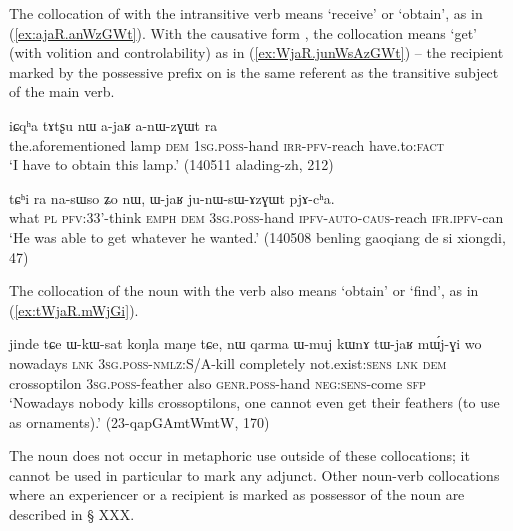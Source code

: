 The collocation of  with the intransitive verb  means `receive' or `obtain', as in (\ref{ex:ajaR.anWzGWt}). With the causative form , the collocation means `get' (with volition and controlability) as in (\ref{ex:WjaR.junWsAzGWt}) -- the recipient marked by the possessive prefix on   is the same referent as the transitive subject of the main verb.

\begin{exe}
\ex \label{ex:ajaR.anWzGWt}
\gll iɕqʰa tɤtʂu nɯ a-jaʁ a-nɯ-zɣɯt ra \\
the.aforementioned lamp \textsc{dem} \textsc{1sg}.\textsc{poss}-hand \textsc{irr}-\textsc{pfv}-reach have.to:\textsc{fact} \\
\glt   `I have to obtain this lamp.' (140511 alading-zh, 212)
\end{exe}

\begin{exe}
\ex \label{ex:WjaR.junWsAzGWt}
\gll tɕʰi ra na-sɯso ʑo nɯ, ɯ-jaʁ ju-nɯ-sɯ-ɤzɣɯt pjɤ-cʰa.  \\
what \textsc{pl} \textsc{pfv}:3\fl{}3'-think \textsc{emph} \textsc{dem} \textsc{3sg}.\textsc{poss}-hand \textsc{ipfv}-\textsc{auto}-\textsc{caus}-reach \textsc{ifr}.\textsc{ipfv}-can \\
\glt  `He was able to get whatever he wanted.' (140508 benling gaoqiang de si xiongdi, 47)
\end{exe}

The collocation of the noun  with the verb  also means `obtain' or `find', as in (\ref{ex:tWjaR.mWjGi}).

\begin{exe}
\ex \label{ex:tWjaR.mWjGi}
\gll jinde tɕe ɯ-kɯ-sat koŋla maŋe tɕe, nɯ qarma ɯ-muj kɯnɤ tɯ-jaʁ mɯ́j-ɣi wo \\
nowadays \textsc{lnk} \textsc{3sg}.\textsc{poss}-\textsc{nmlz}:S/A-kill completely not.exist:\textsc{sens} \textsc{lnk} \textsc{dem} crossoptilon \textsc{3sg}.\textsc{poss}-feather also \textsc{genr}.\textsc{poss}-hand \textsc{neg}:\textsc{sens}-come \textsc{sfp} \\
\glt `Nowadays nobody kills crossoptilons, one cannot even get their feathers (to use as ornaments).' (23-qapGAmtWmtW, 170)
\end{exe}

The noun  does not occur in metaphoric use outside of these collocations; it cannot be used in particular to mark any adjunct. Other noun-verb collocations where an experiencer or a recipient is marked as possessor of the noun are described in § XXX.

